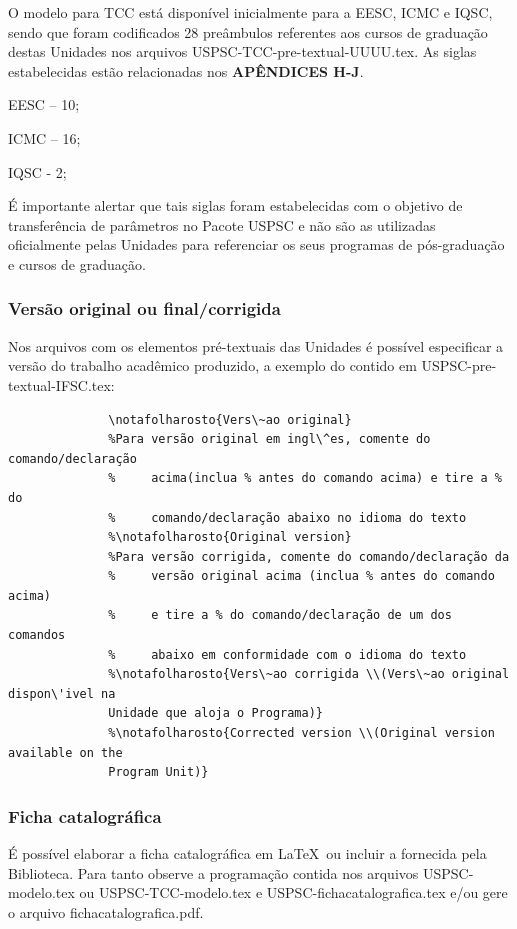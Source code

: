 O modelo para TCC est\'a disponível inicialmente para a EESC, ICMC e IQSC, sendo que foram codificados 28 pre\^ambulos referentes aos cursos de graduação destas Unidades nos arquivos USPSC-TCC-pre-textual-UUUU.tex. As siglas estabelecidas estão relacionadas nos \textbf{APÊNDICES H-J}.
				\begin{alineas}
					\item EESC – 10;
					\item  ICMC – 16;
					\item  IQSC - 2;
				\end{alineas}	
	  						
É importante alertar que tais siglas foram estabelecidas com o objetivo de transfer\^encia de par\^ametros no Pacote USPSC e não são as utilizadas oficialmente pelas Unidades para referenciar os seus programas de pós-graduação e cursos de graduação.

\subsubsection{Versão original ou final/corrigida}
Nos arquivos com os elementos pr\'e-textuais das Unidades \'e possível especificar a versão do trabalho acad\^emico produzido, a exemplo do contido em USPSC-pre-textual-IFSC.tex:	  
			  \begin{verbatim}
			  \notafolharosto{Vers\~ao original}
			  %Para versão original em ingl\^es, comente do comando/declaração 
			  %     acima(inclua % antes do comando acima) e tire a % do 
			  %     comando/declaração abaixo no idioma do texto
			  %\notafolharosto{Original version} 
			  %Para versão corrigida, comente do comando/declaração da 
			  %     versão original acima (inclua % antes do comando acima) 
			  %     e tire a % do comando/declaração de um dos comandos 
			  %     abaixo em conformidade com o idioma do texto
			  %\notafolharosto{Vers\~ao corrigida \\(Vers\~ao original dispon\'ivel na
			  Unidade que aloja o Programa)}
			  %\notafolharosto{Corrected version \\(Original version available on the
			  Program Unit)}
			  \end{verbatim}
			  
\subsubsection{Ficha catalogr\'afica}
É possível elaborar a ficha catalogr\'afica em \LaTeX\ ou incluir a fornecida pela Biblioteca. Para tanto observe a programação contida nos arquivos USPSC-modelo.tex ou USPSC-TCC-modelo.tex  e USPSC-fichacatalografica.tex e/ou gere o arquivo fichacatalografica.pdf.
	  
